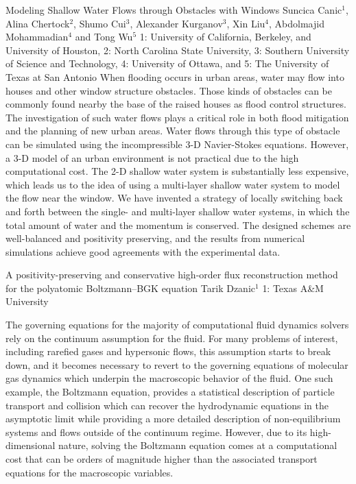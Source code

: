 \begin{addmargin}[2em]{0em}
\vspace{1.5ex}
\abs
{Modeling Shallow Water Flows through Obstacles with Windows}
{Suncica Canic$^{1}$, Alina Chertock$^{2}$, Shumo Cui$^{3}$, Alexander Kurganov$^{3}$, Xin Liu$^{4}$, Abdolmajid Mohammadian$^{4}$ and Tong Wu$^{5}$}
{1: University of California, Berkeley, and University of Houston, 2: North Carolina State University, 3: Southern University of Science and Technology, 4: University of Ottawa, and 5: The University of Texas at San Antonio}
{When flooding occurs in urban areas, water may flow into houses and other window structure obstacles. Those kinds of obstacles can be commonly found nearby the base of the raised houses as flood control structures. The investigation of such water flows plays a critical role in both flood mitigation and the planning of new urban areas. Water flows through this type of obstacle can be simulated using the incompressible 3-D Navier-Stokes equations. However, a 3-D model of an urban environment is not practical due to the high computational cost. The 2-D shallow water system is substantially less expensive, which leads us to the idea of using a multi-layer shallow water system to model the flow near the window. We have invented a strategy of locally switching back and forth between the single- and multi-layer shallow water systems, in which the total amount of water and the momentum is conserved. The designed schemes are well-balanced and positivity preserving, and the results from numerical simulations achieve good agreements with the experimental data.}


\vspace{1.5ex}
\abs
{ A positivity-preserving and conservative high-order flux reconstruction method for the polyatomic Boltzmann–BGK equation}
{Tarik Dzanic$^{1}$}
{1: Texas A\&M University}
{The governing equations for the majority of computational fluid dynamics solvers rely on the continuum assumption for the fluid. For many problems of interest, including rarefied gases and hypersonic flows, this assumption starts to break down, and it becomes necessary to revert to the governing equations of molecular gas dynamics which underpin the macroscopic behavior of the fluid. One such example, the Boltzmann equation, provides a statistical description of particle transport and collision which can recover the hydrodynamic equations in the asymptotic limit while providing a more detailed description of non-equilibrium systems and flows outside of the continuum regime. However, due to its high-dimensional nature, solving the Boltzmann equation comes at a computational cost that can be orders of magnitude higher than the associated transport equations for the macroscopic variables.

}
\end{addmargin}
